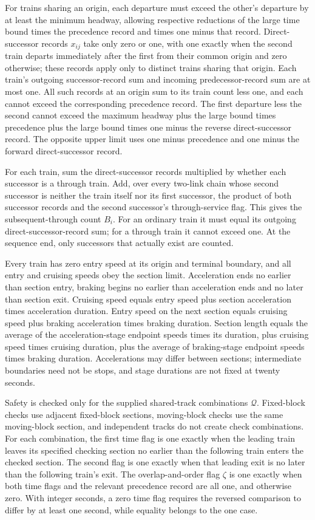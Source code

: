 \documentclass[10pt]{article}
\begin{document}
For trains sharing an origin, each departure must exceed the other's departure by at least the minimum headway, allowing respective reductions of the large time bound times the precedence record and times one minus that record. Direct-successor records $x_{ij}$ take only zero or one, with one exactly when the second train departs immediately after the first from their common origin and zero otherwise; these records apply only to distinct trains sharing that origin. Each train's outgoing successor-record sum and incoming predecessor-record sum are at most one. All such records at an origin sum to its train count less one, and each cannot exceed the corresponding precedence record. The first departure less the second cannot exceed the maximum headway plus the large bound times precedence plus the large bound times one minus the reverse direct-successor record. The opposite upper limit uses one minus precedence and one minus the forward direct-successor record.

For each train, sum the direct-successor records multiplied by whether each successor is a through train. Add, over every two-link chain whose second successor is neither the train itself nor its first successor, the product of both successor records and the second successor's through-service flag. This gives the subsequent-through count $B_i$. For an ordinary train it must equal its outgoing direct-successor-record sum; for a through train it cannot exceed one. At the sequence end, only successors that actually exist are counted.

Every train has zero entry speed at its origin and terminal boundary, and all entry and cruising speeds obey the section limit. Acceleration ends no earlier than section entry, braking begins no earlier than acceleration ends and no later than section exit. Cruising speed equals entry speed plus section acceleration times acceleration duration. Entry speed on the next section equals cruising speed plus braking acceleration times braking duration. Section length equals the average of the acceleration-stage endpoint speeds times its duration, plus cruising speed times cruising duration, plus the average of braking-stage endpoint speeds times braking duration. Accelerations may differ between sections; intermediate boundaries need not be stops, and stage durations are not fixed at twenty seconds.

Safety is checked only for the supplied shared-track combinations $\mathcal Q$. Fixed-block checks use adjacent fixed-block sections, moving-block checks use the same moving-block section, and independent tracks do not create check combinations. For each combination, the first time flag is one exactly when the leading train leaves its specified checking section no earlier than the following train enters the checked section. The second flag is one exactly when that leading exit is no later than the following train's exit. The overlap-and-order flag $\zeta$ is one exactly when both time flags and the relevant precedence record are all one, and otherwise zero. With integer seconds, a zero time flag requires the reversed comparison to differ by at least one second, while equality belongs to the one case.
\end{document}

